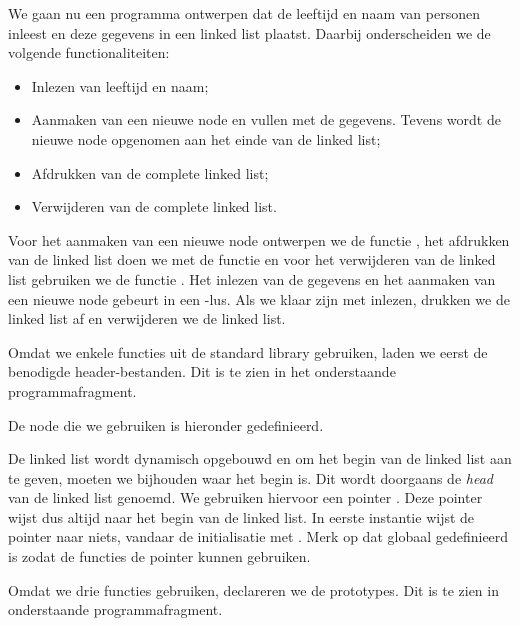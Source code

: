 We gaan nu een programma ontwerpen dat de leeftijd en naam van personen inleest en deze gegevens in een linked list plaatst. Daarbij onderscheiden we de volgende functionaliteiten:

\begin{itemize}
\item Inlezen van leeftijd en naam;
\item Aanmaken van een nieuwe node en vullen met de gegevens. Tevens wordt de nieuwe node opgenomen aan het einde van de linked list;
\item Afdrukken van de complete linked list;
\item Verwijderen van de complete linked list.
\end{itemize}

Voor het aanmaken van een nieuwe node ontwerpen we de functie , het afdrukken van de linked list doen we met de functie  en voor het verwijderen van de linked list gebruiken we de functie . Het inlezen van de gegevens en het aanmaken van een nieuwe node gebeurt in een -lus. Als we klaar zijn met inlezen, drukken we de linked list af en verwijderen we de linked list.

Omdat we enkele functies uit de standard library gebruiken, laden we eerst de benodigde header-bestanden. Dit is te zien in het onderstaande programmafragment.


De node die we gebruiken is hieronder gedefinieerd.


De linked list wordt dynamisch opgebouwd en om het begin van de linked list aan te geven, moeten we bijhouden waar het begin is. Dit wordt doorgaans de \textsl{head} van de linked list genoemd. We gebruiken hiervoor een pointer . Deze pointer wijst dus altijd naar het begin van de linked list. In eerste instantie wijst de pointer naar niets, vandaar de initialisatie met . Merk op dat  globaal gedefinieerd is zodat de functies de pointer kunnen gebruiken.


Omdat we drie functies gebruiken, declareren we de prototypes. Dit is te zien in onderstaande programmafragment.


